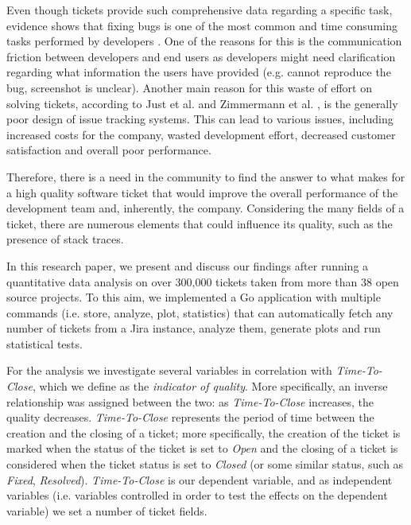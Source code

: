 \documentclass{mpaper}
\begin{document}
Even though tickets provide such comprehensive data regarding a specific task, evidence shows 
that fixing bugs is one of the most common and time consuming tasks performed by developers \cite{latoza2006maintaining}. One of
the reasons for this is the communication friction between developers and end users \cite{Korkala2014WasteIdentification}
as developers might need clarification regarding what information the users have provided (e.g. cannot reproduce the bug, 
screenshot is unclear). Another main reason for this waste of effort on solving tickets, according to 
Just et al. \cite{just2008towards} and Zimmermann et al. \cite{zimmermann2009improving}, is the generally poor design of issue 
tracking systems. This can lead to various issues, including increased costs for the company, wasted development effort, 
decreased customer satisfaction and overall poor performance.

Therefore, there is a need in the community to find the answer to what makes for a high quality software ticket 
that would improve the overall performance of the development team and, inherently, the company. Considering the many fields of 
a ticket, there are numerous elements that could influence its quality, such as the presence of stack traces.

In this research paper, we present and discuss our findings after running a quantitative data analysis 
on over 300,000 tickets taken from more than 38 open source projects. To this aim, we implemented a Go application 
with multiple commands (i.e. store, analyze, plot, statistics) that can automatically fetch any number of tickets 
from a Jira instance, analyze them, generate plots and run statistical tests. 

For the analysis we investigate several variables in correlation with \emph{Time-To-Close}, 
which we define as the \emph{indicator of quality}. More specifically, an inverse relationship was assigned between the 
two: as \emph{Time-To-Close} increases, the quality decreases. \emph{Time-To-Close} represents the period of time between the creation 
and the closing of a ticket; more specifically, the creation of the ticket is marked when the status of the ticket is set to 
\emph{Open} and the closing of a ticket is considered when the ticket status is set to \emph{Closed} (or some similar status, 
such as \emph{Fixed}, \emph{Resolved}). \emph{Time-To-Close} is our dependent variable, and as independent variables 
(i.e. variables controlled in order to test the effects on the dependent variable) we set a number of ticket fields. 
\end{document}
